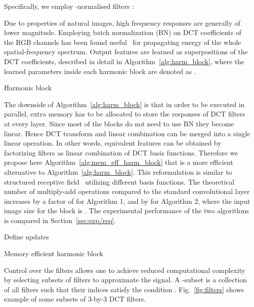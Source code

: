 \documentclass[conference]{IEEEtran}
\begin{document}
Specifically, we employ -normalised filters :

Due to properties of natural images, high frequency responses are generally of lower magnitude. Employing batch normalization (BN) on DCT coefficients of the RGB channels has been found useful~\cite{Ulicny18} for propagating energy of the whole spatial-frequency spectrum. Output features  are learned as superpositions of the DCT coefficients, described in detail in Algorithm~\ref{alg:harm_block}, where the learned parameters inside each harmonic block are denoted as .

\begin{algorithm}[!b]
 \KwIn{}
 \For{}{
  
 }
\KwOut{}
\caption{Harmonic block}\label{alg:harm_block}
\end{algorithm}

The downside of Algorithm~\ref{alg:harm_block} is that in order to be executed in parallel, extra memory has to be allocated to store the responses of DCT filters at every layer. Since most of the blocks do not need to use BN they become linear. Hence DCT transform and linear combination can be merged into a single linear operation. In other words, equivalent features can be obtained by factorizing filters as linear combination of DCT basis functions. Therefore we propose here Algorithm~\ref{alg:mem_eff_harm_block} that is a more efficient alternative to Algorithm~\ref{alg:harm_block}. This reformulation is similar to structured receptive field~\cite{Jacobsen16} utilizing different basis functions. The theoretical number of multiply-add operations compared to the standard convolutional layer increases by a factor of  for Algorithm 1, and by  for Algorithm 2, where the input image size for the block is . The experimental performance of the two algorithms is compared in Section~\ref{sec:exp/req}.

\begin{algorithm}[!h]
 \KwIn{}
 {Define updates} \;
 \For{}{
  \For{}{
   \;
  }
 }
 \;
 \KwOut{}
 \caption{Memory efficient harmonic block} \label{alg:mem_eff_harm_block}
\end{algorithm}

Control over the filters allows one to achieve reduced computational complexity by selecting subsets of filters to approximate the signal. A -subset is a collection of all filters  such that their indices  satisfy the condition . Fig.~\ref{fig:filters} shows example of some subsets of 3-by-3 DCT filters.
\end{document}
